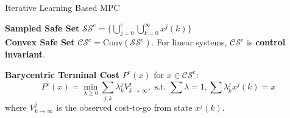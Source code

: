 \begin{sstTitleBox}[RoyalBlue]
  {Iterative Learning Based MPC}
  \begin{sstOnlyFrame}
    \textbf{Sampled Safe Set} $\mathcal{SS}^e = \{ \bigcup_{j=0}^e
    \bigcup_{k=0}^\infty x^j(k) \}$ \\
    \textbf{Convex Safe Set} $\mathcal{CS}^e =
    \text{Conv}(\mathcal{SS}^e)$. For linear systems, $\mathcal{CS}^e$
    is \textbf{control invariant}. \\
  \end{sstOnlyFrame}
  \begin{sstOnlyFrame}
    \textbf{Barycentric Terminal Cost} $P^e(x)$ for $x \in \mathcal{CS}^e$:
    \begin{equation*}
      P^e(x) = \min_{\lambda \ge 0} \sum_{j,k} \lambda_k^j
      V_{k\to\infty}^j, \text{ s.t. } \sum \lambda = 1, \sum
      \lambda_k^j x^j(k) = x
    \end{equation*}
    where $V_{k\to\infty}^j$ is the observed cost-to-go from state $x^j(k)$.
  \end{sstOnlyFrame}
\end{sstTitleBox}

